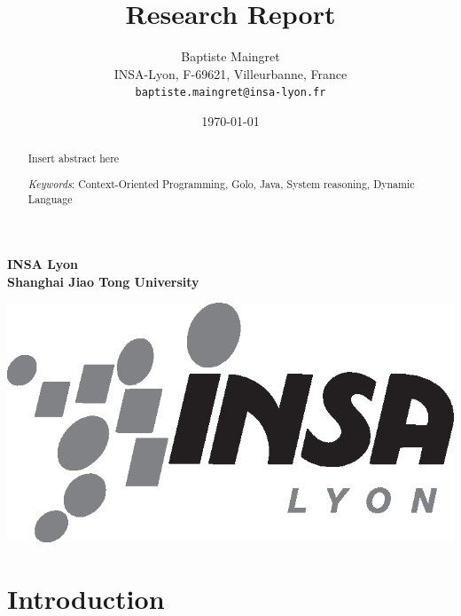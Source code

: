 \documentclass[a4paper]{article}
\begin{document}
\hfill
\begin{minipage}{0.3\columnwidth}
\small
\centering
\textbf{
INSA Lyon \\ %
Shanghai Jiao Tong University
}
\end{minipage}
\hfill
\begin{minipage}[b]{0.25\columnwidth}
\includegraphics[width=\columnwidth]{logo/insa-noir.eps}%
\end{minipage}

\newpage

%
%

\title{Research Report}

\author{Baptiste Maingret\\[10pt]
INSA-Lyon, F-69621, Villeurbanne, France\\
\texttt{baptiste.maingret@insa-lyon.fr}}

\date{\today}
\newcommand{\Keywords}[1]{\par\noindent 
{\small{\em Keywords\/}: Context-Oriented Programming, Golo, Java, System reasoning, Dynamic Language}}
\maketitle

\begin{abstract} 
Insert abstract here
\Keywords{Context-Oriented Programming, Golo, Java, System reasoning, Dynamic Language}
\end{abstract}

\newpage

%
%

\section{Introduction}
\end{document}
